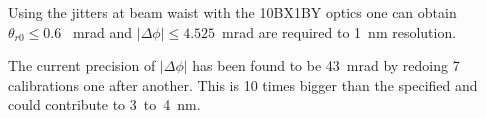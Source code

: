 Using the jitters at beam waist with the 10BX1BY optics one can obtain $\theta_{r0}\leq 0.6$~
mrad and $|\Delta\phi|\leq 4.525$~mrad are required to 1~nm resolution.\par
The current precision of $|\Delta\phi|$ has been found to be 43~mrad by redoing 7 calibrations one after another. This is 10 times bigger than the specified and could contribute to 3~to~4~nm.\par
\pagebreak